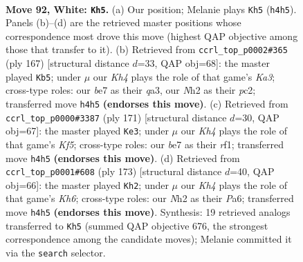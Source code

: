 \documentclass[11pt]{article}
\begin{document}
\clearpage

\begin{figure}[p]\centering
\begin{subfigure}{0.46\textwidth}\centering
\resizebox{\linewidth}{!}{%
\newchessgame
\chessboard[
  setfen={1RQ5/4br1k/R7/8/7K/8/7N/8 w - - 1 92},
  showmover=false,
  pgfstyle=straightmove, color=movearrow, markmove={h4-h5}
]}
\caption{}
\end{subfigure}\hfill
\begin{subfigure}{0.46\textwidth}\centering
\resizebox{\linewidth}{!}{%
\newchessgame
\chessboard[
  setfen={8/8/k7/8/5K2/Q7/2P2P2/6rq b - - 9 84},
  showmover=false,
  pgfstyle=straightmove, color=movearrow, markmove={a6-b5}
]}
\caption{}
\end{subfigure}
\\[4pt]
\begin{subfigure}{0.46\textwidth}\centering
\resizebox{\linewidth}{!}{%
\newchessgame
\chessboard[
  setfen={8/3r4/3r4/2R5/5k2/8/2K5/5R2 b - - 7 86},
  showmover=false,
  pgfstyle=straightmove, color=movearrow, markmove={f4-e3}
]}
\caption{}
\end{subfigure}\hfill
\begin{subfigure}{0.46\textwidth}\centering
\resizebox{\linewidth}{!}{%
\newchessgame
\chessboard[
  setfen={8/8/p3B1R1/8/5K2/7k/8/4r3 b - - 3 87},
  showmover=false,
  pgfstyle=straightmove, color=movearrow, markmove={h3-h2}
]}
\caption{}
\end{subfigure}
\caption{\textbf{Move 92, White: \texttt{Kh5}.} (a) Our position; Melanie plays \texttt{Kh5} (\texttt{h4h5}). Panels (b)--(d) are the retrieved master positions whose correspondence most drove this move (highest QAP objective among those that transfer to it). (b) Retrieved from \texttt{ccrl\_top\_p0002\#365} (ply 167) [structural distance $d$=33, QAP obj=68]: the master played \texttt{Kb5}; under $\mu$ our \emph{Kh4} plays the role of that game's \emph{Ka3}; cross-type roles: our \emph{b}e7 as their \emph{q}a3, our \emph{N}h2 as their \emph{p}c2; transferred move \texttt{h4h5} \textbf{(endorses this move)}. (c) Retrieved from \texttt{ccrl\_top\_p0000\#3387} (ply 171) [structural distance $d$=30, QAP obj=67]: the master played \texttt{Ke3}; under $\mu$ our \emph{Kh4} plays the role of that game's \emph{Kf5}; cross-type roles: our \emph{b}e7 as their \emph{r}f1; transferred move \texttt{h4h5} \textbf{(endorses this move)}. (d) Retrieved from \texttt{ccrl\_top\_p0001\#608} (ply 173) [structural distance $d$=40, QAP obj=66]: the master played \texttt{Kh2}; under $\mu$ our \emph{Kh4} plays the role of that game's \emph{Kh6}; cross-type roles: our \emph{N}h2 as their \emph{P}a6; transferred move \texttt{h4h5} \textbf{(endorses this move)}. Synthesis: 19 retrieved analogs transferred to \texttt{Kh5} (summed QAP objective 676, the strongest correspondence among the candidate moves); Melanie committed it via the \texttt{search} selector.}
\label{fig:thought-m182}
\end{figure}
\end{document}
